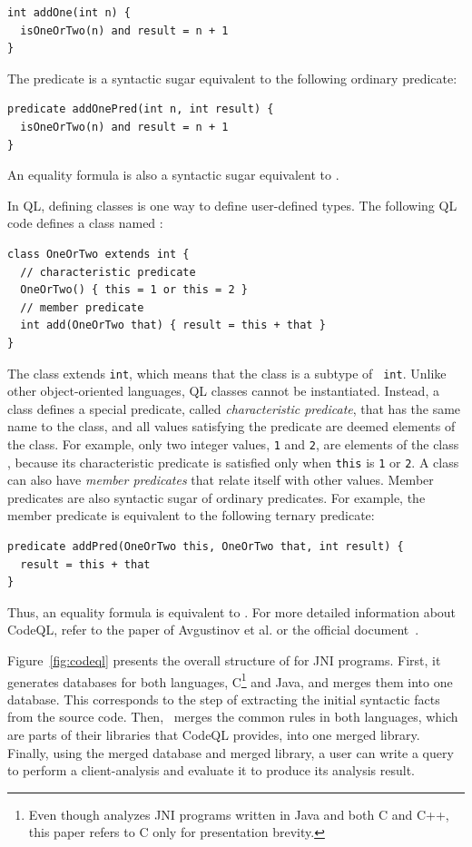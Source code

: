 \begin{lstlisting}[style=codeql,xleftmargin=2.5em]
int addOne(int n) {
  isOneOrTwo(n) and result = n + 1
}
\end{lstlisting}
\noindent
The predicate is a syntactic sugar equivalent to the following ordinary predicate:
\begin{lstlisting}[style=codeql,xleftmargin=2.5em]
predicate addOnePred(int n, int result) {
  isOneOrTwo(n) and result = n + 1
}
\end{lstlisting}
\noindent
An equality formula  is also a syntactic sugar equivalent
to .

In QL, defining classes is one way to define user-defined types.
The following QL code defines a class named :
\begin{lstlisting}[style=codeql,xleftmargin=2.5em]
class OneOrTwo extends int {
  // characteristic predicate
  OneOrTwo() { this = 1 or this = 2 }
  // member predicate
  int add(OneOrTwo that) { result = this + that }
}
\end{lstlisting}
\noindent
The class extends {\tt int}, which means that the class is a subtype of {\tt
int}.  Unlike other object-oriented languages, QL classes cannot be
instantiated.  Instead, a class defines a special predicate, called {\it
characteristic predicate}, that has the same name to the class, and all values
satisfying the predicate are deemed elements of the class.  For example, only
two integer values, {\tt 1} and {\tt 2}, are elements of the class
, because its characteristic predicate is satisfied only when
{\tt this} is {\tt 1} or {\tt 2}.  A class can also have {\it member
predicates} that relate itself with other values.  Member predicates are also
syntactic sugar of ordinary predicates.  For example, the member predicate
 is equivalent to the following ternary predicate:
\begin{lstlisting}[style=codeql,xleftmargin=2.5em]
predicate addPred(OneOrTwo this, OneOrTwo that, int result) {
  result = this + that
}
\end{lstlisting}
Thus, an equality formula  is equivalent to
.
For more detailed information about CodeQL, refer to the paper of Avgustinov et
al.\cite{ql2016} or the official document~\cite{codeql}.

Figure~\ref{fig:codeql} presents the overall structure of \ours for JNI
programs.  First, it generates databases for both languages, C\footnote{ Even
though \ours analyzes JNI programs written in Java and both C and C++, this
paper refers to C only for presentation brevity.} and Java, and merges them
into one database.  This corresponds to the step of extracting the initial
syntactic facts from the source code.  Then, \ours~merges the common rules in
both languages, which are parts of their libraries that CodeQL provides, into
one merged library.  Finally, using the merged database and merged library, a
user can write a query to perform a client-analysis and evaluate it to produce
its analysis result.

